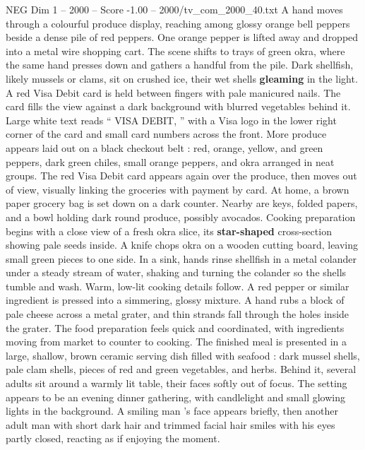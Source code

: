 \begin{textsample}{NEG Dim 1 – 2000 – Score -1.00 – 2000/tv\_com\_2000\_40.txt}  \label{ex:f1_neg_065}
A hand moves through a colourful produce display, reaching among glossy orange bell peppers beside a dense pile of red peppers.
One orange pepper is lifted away and dropped into a metal wire shopping cart.
The scene shifts to trays of green okra, where the same hand presses down and gathers a handful from the pile.
Dark shellfish, likely mussels or clams, sit on crushed ice, their wet shells \textbf{gleaming} in the light.
A red Visa Debit card is held between fingers with pale manicured nails.
The card fills the view against a dark background with blurred vegetables behind it.
Large white text reads “ VISA DEBIT, ” with a Visa logo in the lower right corner of the card and small card numbers across the front.
More produce appears laid out on a black checkout belt : red, orange, yellow, and green peppers, dark green chiles, small orange peppers, and okra arranged in neat groups.
The red Visa Debit card appears again over the produce, then moves out of view, visually linking the groceries with payment by card.
At home, a brown paper grocery bag is set down on a dark counter.
Nearby are keys, folded papers, and a bowl holding dark round produce, possibly avocados.
Cooking preparation begins with a close view of a fresh okra slice, its \textbf{star-shaped} cross-section showing pale seeds inside.
A knife chops okra on a wooden cutting board, leaving small green pieces to one side.
In a sink, hands rinse shellfish in a metal colander under a steady stream of water, shaking and turning the colander so the shells tumble and wash.
Warm, low-lit cooking details follow.
A red pepper or similar ingredient is pressed into a simmering, glossy mixture.
A hand rubs a block of pale cheese across a metal grater, and thin strands fall through the holes inside the grater.
The food preparation feels quick and coordinated, with ingredients moving from market to counter to cooking.
The finished meal is presented in a large, shallow, brown ceramic serving dish filled with seafood : dark mussel shells, pale clam shells, pieces of red and green vegetables, and herbs.
Behind it, several adults sit around a warmly lit table, their faces softly out of focus.
The setting appears to be an evening dinner gathering, with candlelight and small glowing lights in the background.
A smiling man ’s face appears briefly, then another adult man with short dark hair and trimmed facial hair smiles with his eyes partly closed, reacting as if enjoying the moment.

\end{textsample}
